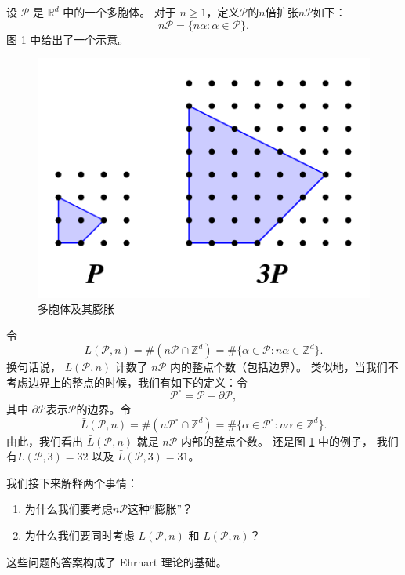 \documentclass[12pt,a4paper]{ctexbook} %
\numberwithin{figure}{section}
\theoremstyle{problemstyle}
\numberwithin{equation}{section} %
\begin{document}
设 $ \mathcal{P} $ 是 $\mathbb{R}^d$ 中的一个多胞体。
对于 $ n \geq 1 $，定义$\mathcal{P}$的$n$倍扩张$n\mathcal{P}$如下：
$$
n\mathcal{P} = \{ n\alpha : \alpha \in \mathcal{P} \}.
$$
图 \ref{fig:poly-Example} 中给出了一个示意。
\begin{figure}
    \centering
    \includegraphics[width=0.6\linewidth]{lattice.png}
    \caption{多胞体及其膨胀}
    \label{fig:poly-Example}
\end{figure}
令
\begin{equation*}
L(\mathcal{P}, n) = \#(n\mathcal{P} \cap \mathbb{Z}^d)
= \#\{\alpha \in \mathcal{P} : n\alpha \in \mathbb{Z}^d\}.
\end{equation*}
换句话说，
\( L(\mathcal{P}, n) \) 计数了 \( n\mathcal{P} \) 内的整点个数（包括边界）。
类似地，当我们不考虑边界上的整点的时候，我们有如下的定义：令
\begin{equation*}
\mathcal{P}^{\circ} = \mathcal{P} - \partial \mathcal{P},
\end{equation*}
其中 $\partial \mathcal{P}$表示$\mathcal{P}$的边界。令
\begin{equation*}
\bar{L}(\mathcal{P}, n) = \#(n\mathcal{P}^{\circ} \cap \mathbb{Z}^d)
= \#\{\alpha \in \mathcal{P}^{\circ} : n\alpha \in \mathbb{Z}^d\}.
\end{equation*}
由此，我们看出 \( \bar{L}(\mathcal{P}, n) \) 就是 \( n\mathcal{P} \) 内部的整点个数。
还是图 \ref{fig:poly-Example} 中的例子，
我们有$L(\mathcal{P},3)= 32$ 以及 
\( \bar{L}(\mathcal{P},3)= 31\)。


我们接下来解释两个事情：
\begin{enumerate}
    \item[(1)] 为什么我们要考虑$n\mathcal{P}$这种“膨胀”？
    \item[(2)] 为什么我们要同时考虑 $L(\mathcal{P},n)$ 和 $\bar{L}(\mathcal{P},n)$？
\end{enumerate}
这些问题的答案构成了 Ehrhart 理论的基础。
\end{document}
